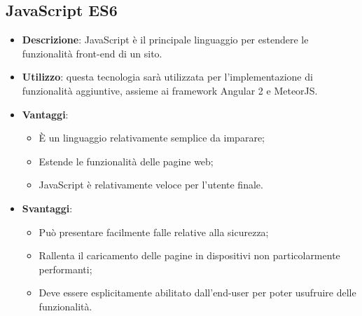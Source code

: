 \subsection{JavaScript ES6}
\begin{itemize}
	\item \textbf{Descrizione}: JavaScript è il principale linguaggio per estendere le funzionalità front-end di un sito.
	\item \textbf{Utilizzo}: questa tecnologia sarà utilizzata per l'implementazione di funzionalità aggiuntive, assieme ai framework Angular 2 e MeteorJS.
	\item \textbf{Vantaggi}:
	\begin{itemize}
		\item \MakeUppercase{è} un linguaggio relativamente semplice da imparare;
		\item Estende le funzionalità delle pagine web;
		\item JavaScript è relativamente veloce per l'utente finale.
	\end{itemize}
	\item \textbf{Svantaggi}:
	\begin{itemize}
		\item Può presentare facilmente falle relative alla sicurezza;
		\item Rallenta il caricamento delle pagine in dispositivi non particolarmente performanti;
		\item Deve essere esplicitamente abilitato dall'end-user per poter usufruire delle funzionalità.
	\end{itemize}
\end{itemize}


